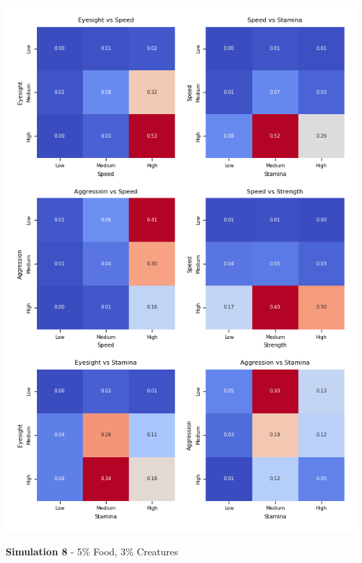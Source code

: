 \documentclass{article}
\begin{document}
\begin{center}
    \includegraphics[scale=0.9]{tests/2.7_confusion_matrices.png}
\end{center}
\textbf{Simulation 8} - 5\% Food, 3\% Creatures
\end{document}
